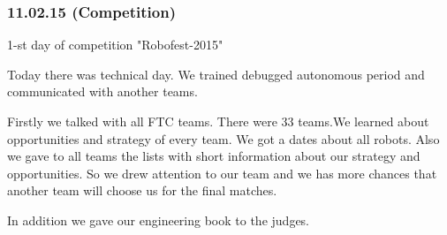 \subsubsection{11.02.15 (Competition)}
\begin{center}
	1-st day of competition "Robofest-2015"
\end{center}
Today there was technical day. We trained debugged autonomous period and communicated with another teams.\newline

Firstly we talked with all FTC teams. There were 33 teams.We learned about opportunities and strategy of every team. We got a dates about all robots. Also we gave to all teams the lists with short information about our strategy and opportunities. So we drew attention to our team and we has more chances that another team will choose us for the final matches.\newline

In addition we gave our engineering book to the judges.\newline

